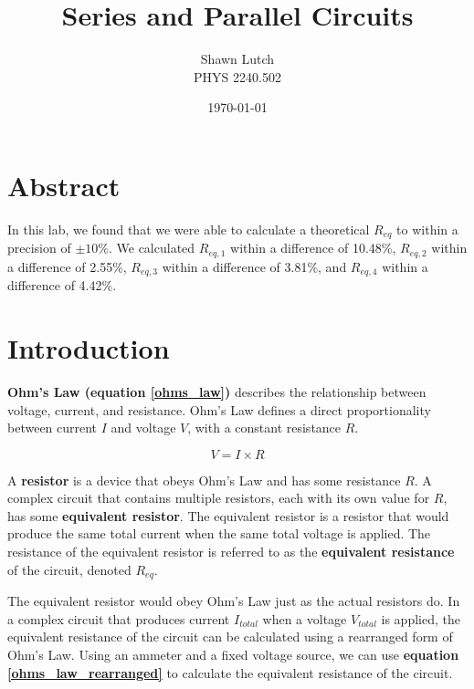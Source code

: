 \documentclass[12pt,letterpaper,titlepage]{report}
\newcommand{\myTitle}{Series and Parallel Circuits}
\newcommand{\myName}{Shawn Lutch}
\newcommand{\myPeriod}{PHYS 2240.502}
\begin{document}


\title{\myTitle{}}
\author{\myName{}\\ \myPeriod{}}
\date{\today}
\maketitle




\section*{Abstract}

In this lab, we found that we were able to calculate a theoretical $R_{eq}$ to within a precision of $\pm 10\%$. We calculated $R_{eq, 1}$ within a difference of 10.48\%, $R_{eq, 2}$ within a difference of 2.55\%, $R_{eq, 3}$ within a difference of 3.81\%, and $R_{eq, 4}$ within a difference of 4.42\%.



\bigskip
\section*{Introduction}

\textbf{Ohm's Law (equation \ref{ohms_law})} describes the relationship between voltage, current, and resistance. Ohm's Law defines a direct proportionality between current $I$ and voltage $V$, with a constant resistance $R$.

\begin{equation} \label{ohms_law}
V = I \times R
\end{equation}

A \textbf{resistor} is a device that obeys Ohm's Law and has some resistance $R$. A complex circuit that contains multiple resistors, each with its own value for $R$, has some \textbf{equivalent resistor}. The equivalent resistor is a resistor that would produce the same total current when the same total voltage is applied. The resistance of the equivalent resistor is referred to as the \textbf{equivalent resistance} of the circuit, denoted $R_{eq}$.

\medskip
The equivalent resistor would obey Ohm's Law just as the actual resistors do. In a complex circuit that produces current $I_{total}$ when a voltage $V_{total}$ is applied, the equivalent resistance of the circuit can be calculated using a rearranged form of Ohm's Law. Using an ammeter and a fixed voltage source, we can use \textbf{equation \ref{ohms_law_rearranged}} to calculate the equivalent resistance of the circuit.
\end{document}
